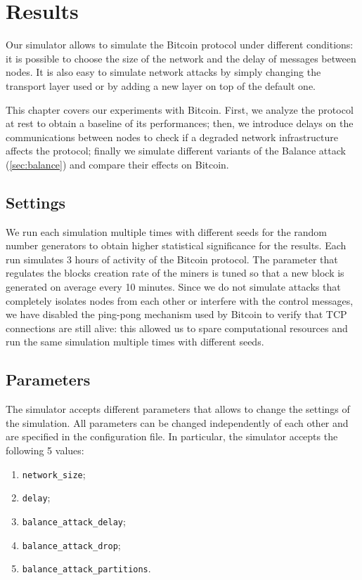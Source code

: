 \def \myextraleftmargin {-0.2cm}
\def \myplotswitdth {0.95}

\chapter{Results}
\label{chapter:results}
Our simulator allows to simulate the Bitcoin protocol under different conditions:
it is possible to choose the size of the network and the delay of messages between nodes.
It is also easy to simulate network attacks by simply changing the transport layer used or by adding a new layer on top of the default one.

\medskip
This chapter covers our experiments with Bitcoin.
First, we analyze the protocol at rest to obtain a baseline of its performances;
then, we introduce delays on the communications between nodes to check if a degraded network infrastructure affects the protocol;
finally we simulate different variants of the Balance attack (\cref{sec:balance}) and compare their effects on Bitcoin.


\section{Settings}
We run each simulation multiple times with different seeds for the random number generators to obtain higher statistical significance for the results.
Each run simulates \num{3} hours of activity of the Bitcoin protocol.
The parameter that regulates the blocks creation rate of the miners is tuned so that a new block is generated on average every \num{10} minutes.
Since we do not simulate attacks that completely isolates nodes from each other or interfere with the control messages, we have disabled the ping-pong mechanism used by Bitcoin to verify that TCP connections are still alive:
this allowed us to spare computational resources and run the same simulation multiple times with different seeds.


\section{Parameters}
The simulator accepts different parameters that allows to change the settings of the simulation.
All parameters can be changed independently of each other and are specified in the configuration file.
In particular, the simulator accepts the following \num{5} values:
\begin{enumerate}
	\item \texttt{network\_size};
	\item \texttt{delay};
	\item \texttt{balance\_attack\_delay};
	\item \texttt{balance\_attack\_drop};
	\item \texttt{balance\_attack\_partitions}.
\end{enumerate}

